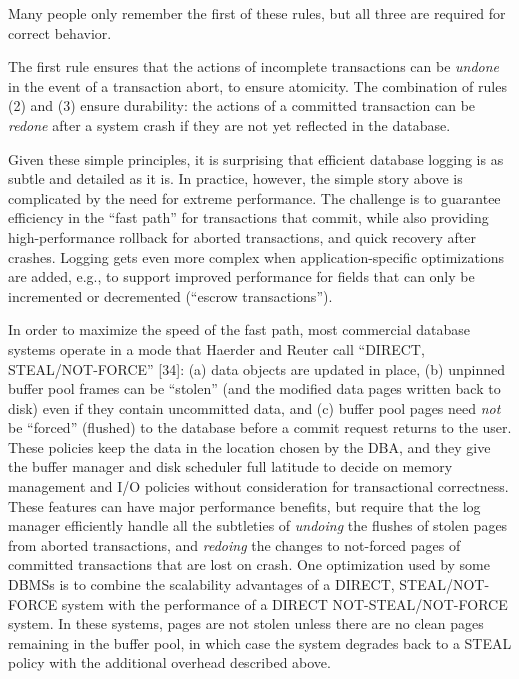 \documentclass[a4paper,11pt,twoside,openright]{book}
\begin{document}
Many people only remember the first of these rules, but all three are
required for correct behavior.

The first rule ensures that the actions of incomplete transactions can
be \emph{undone} in the event of a transaction abort, to ensure
atomicity. The combination of rules (2) and (3) ensure durability: the
actions of a committed transaction can be \emph{redone} after a system
crash if they are not yet reflected in the database.

Given these simple principles, it is surprising that efficient database
logging is as subtle and detailed as it is. In practice, however, the
simple story above is complicated by the need for extreme performance.
The challenge is to guarantee efficiency in the ``fast path'' for
transactions that commit, while also providing high-performance rollback
for aborted transactions, and quick recovery after crashes. Logging gets
even more complex when application-specific optimizations are added,
e.g., to support improved performance for fields that can only be
incremented or decremented (``escrow transactions'').

In order to maximize the speed of the fast path, most commercial
database systems operate in a mode that Haerder and Reuter call
``DIRECT, STEAL/NOT-FORCE'' {[}34{]}: (a) data objects are updated in
place, (b) unpinned buffer pool frames can be ``stolen'' (and the
modified data pages written back to disk) even if they contain
uncommitted data, and (c) buffer pool pages need \emph{not} be
``forced'' (flushed) to the database before a commit request returns to
the user. These policies keep the data in the location chosen by the
DBA, and they give the buffer manager and disk scheduler full latitude
to decide on memory management and I/O policies without consideration
for transactional correctness. These features can have major performance
benefits, but require that the log manager efficiently handle all the
subtleties of \emph{undoing} the flushes of stolen pages from aborted
transactions, and \emph{redoing} the changes to not-forced pages of
committed transactions that are lost on crash. One optimization used by
some DBMSs is to combine the scalability advantages of a DIRECT,
STEAL/NOT-FORCE system with the performance of a DIRECT
NOT-STEAL/NOT-FORCE system. In these systems, pages are not stolen
unless there are no clean pages remaining in the buffer pool, in which
case the system degrades back to a STEAL policy with the additional
overhead described above.
\end{document}
